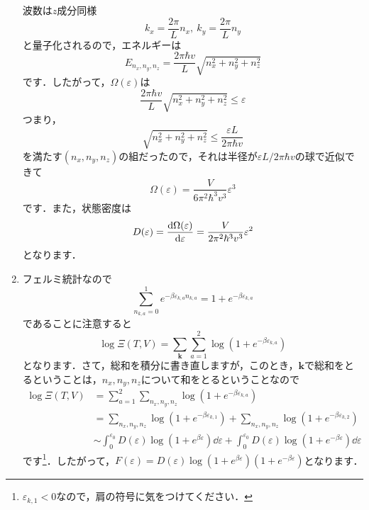 \documentclass[a4paper,pdflatex,ja=standard]{bxjsarticle}
\begin{document}
\begin{enumerate}
  波数は$z$成分同様
  \begin{equation}
    k_x
    =
    \frac{2\pi}{L}n_x
    ,\ 
    k_y
    =
    \frac{2\pi}{L}n_y
  \end{equation}
  と量子化されるので，エネルギーは
  \begin{equation}
    E_{n_x,n_y,n_z}
    =
    \frac{2\pi\hbar v}{L}
    \sqrt{n_x^2+n_y^2+n_z^2}
  \end{equation}
  です．したがって，$\Omega(\varepsilon)$は
  \begin{equation}    
    \frac{2\pi\hbar v}{L}
    \sqrt{n_x^2+n_y^2+n_z^2}
    \leq 
    \varepsilon
  \end{equation}
  つまり，
  \begin{equation}
    \sqrt{n_x^2+n_y^2+n_z^2}
    \leq
    \frac{\varepsilon L}{2\pi\hbar v}
  \end{equation}
  を満たす$(n_x,n_y,n_z)$の組だったので，それは半径が$\varepsilon L/2\pi\hbar v$の球で近似できて
  \begin{equation}
    \Omega(\varepsilon)
    =
    \frac{V}{6\pi^2\hbar^3 v^3}\varepsilon^3
  \end{equation}
  です．また，状態密度は
  \begin{equation}
    D(\varepsilon)
    =
    \dv{\Omega(\varepsilon)}{\varepsilon}
    =
    \frac{V}{2\pi^2\hbar^3 v^3}\varepsilon^2
  \end{equation}
  となります．


  \item 

  フェルミ統計なので
  \begin{equation}
    \sum_{n_{k,a}=0}^{1}
    e^{-\beta\varepsilon_{k,a}n_{k,a}}
    =
    1+e^{-\beta\varepsilon_{k,a}}
  \end{equation}
  であることに注意すると
  \begin{equation}
    \log \Xi(T,V)
    =
    \sum_{\bm{k}}\sum_{a=1}^{2}
    \log (1+e^{-\beta\varepsilon_{k,a}})
  \end{equation}
  となります．さて，総和を積分に書き直しますが，このとき，$\bm{k}$で総和をとるということは，$n_x,n_y,n_z$について和をとるということなので
  \begin{align}
    \log \Xi(T,V)
    &=
    \sum_{a=1}^{2}
    \sum_{n_x,n_y,n_z}
    \log (1+e^{-\beta\varepsilon_{k,a}})
    \nonumber
    \\
    &=
    \sum_{n_x,n_y,n_z}
    \log (1+e^{-\beta\varepsilon_{k,1}})
    +
    \sum_{n_x,n_y,n_z}
    \log (1+e^{-\beta\varepsilon_{k,2}})
    \nonumber
    \\
    &\sim
    \int_0^{\varepsilon_0}
    D(\varepsilon)
    \log (1+e^{\beta\varepsilon})
    \dd \varepsilon
    +
    \int_0^{\varepsilon_0}
    D(\varepsilon)
    \log (1+e^{-\beta\varepsilon})
    \dd \varepsilon
    \label{ans2_5}
  \end{align}
  です\footnote{
    $\varepsilon_{k,1}<0$なので，肩の符号に気をつけてください．
  }．したがって，$F(\varepsilon)=D(\varepsilon)\log (1+e^{\beta\varepsilon})(1+e^{-\beta\varepsilon})$となります．



\end{enumerate}
\end{document}
